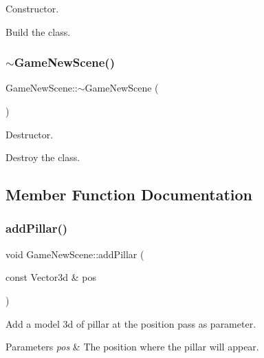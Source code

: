 Constructor. 

Build the class. \mbox{\label{classGameNewScene_a3df0ff81012d3f7dbd08c7367be22fdf}} 
\subsubsection{\texorpdfstring{$\sim$\+Game\+New\+Scene()}{~GameNewScene()}}
{\footnotesize\ttfamily Game\+New\+Scene\+::$\sim$\+Game\+New\+Scene (\begin{DoxyParamCaption}{ }\end{DoxyParamCaption})}



Destructor. 

Destroy the class. 

\subsection{Member Function Documentation}
\mbox{\label{classGameNewScene_a59826abb850ba5d561a42865efb6a17a}} 
\subsubsection{\texorpdfstring{add\+Pillar()}{addPillar()}}
{\footnotesize\ttfamily void Game\+New\+Scene\+::add\+Pillar (\begin{DoxyParamCaption}\item[{const Vector3d \&}]{pos }\end{DoxyParamCaption})}



Add a model 3d of pillar at the position pass as parameter. 


\begin{DoxyParams}{Parameters}
{\em pos} & The position where the pillar will appear. \\
\hline
\end{DoxyParams}
\mbox{\label{classGameNewScene_a21c27ef3ea1923d975683e1bcdd134fa}} 
